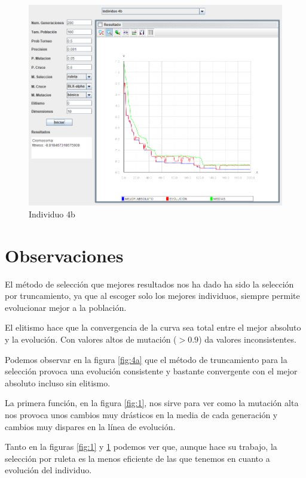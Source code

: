 \documentclass[twoside]{AiTeX}
\begin{document}
\begin{figure}[H]
    \centering
    \includegraphics[width = \textwidth]{Images/Individuo4b.png}
    \caption{Individuo 4b}
    \label{fig:4b}
\end{figure}


\section{Observaciones}

El método de selección que mejores resultados nos ha dado ha sido la selección por truncamiento, ya que al escoger solo los mejores individuos, siempre permite evolucionar mejor a la población.

El elitismo hace que la convergencia de la curva sea total entre el mejor absoluto y la evolución. Con valores altos de mutación ($>0.9$) da valores inconsistentes.

Podemos observar en la figura \ref{fig:4a} que el método de truncamiento para la selección provoca una evolución consistente y bastante convergente con el mejor absoluto incluso sin elitismo.

La primera función, en la figura \ref{fig:1}, nos sirve para ver como la mutación alta nos provoca unos cambios muy drásticos en la media de cada generación y cambios muy dispares en la línea de evolución.

Tanto en la figuras \ref{fig:1} y \ref{fig:4b} podemos ver que, aunque hace su trabajo, la selección por ruleta es la menos eficiente de las que tenemos en cuanto a evolución del individuo.
\end{document}
